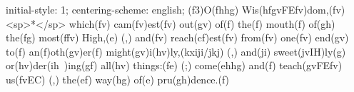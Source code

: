 initial-style: 1;
centering-scheme: english;
(f3)O(fhhg) Wis(hfgvFEfv)dom,(fv) <sp>*</sp> which(fv) cam(fv)est(fv) out(gv) of(f) the(f) mouth(f) of(gh) the(fg) most(ffv) High,(e) (,) and(fv) reach(cf)est(fv) from(fv) one(fv) end(gv) to(f) an(f)oth(gv)er(f) might(gv)i(hv)ly,(kxiji/jkj) (,) and(ji) sweet(jvIH)ly(g) or(hv)der(ih~)ing(gf) all(hv) things:(fe) (;) come(ehhg) and(f) teach(gvFEfv) us(fvEC) (,) the(ef) way(hg) of(e) pru(gh)dence.(f)
